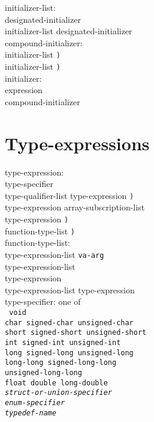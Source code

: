 \documentclass[a4j,twocolumn]{article}
\begin{document}
\noindent
initializer-list: \\
\quad designated-initializer \\
\quad initializer-list designated-initializer \\

\noindent
compound-initializer: \\
 initializer-list {\tt )}\\
 initializer-list {\tt )}\\

\noindent
initializer: \\
\quad expression \\
\quad compound-initializer \\
                            
\rm
\section{Type-expressions}
\it

\noindent
type-expression: \\
\quad type-specifier \\
\quad {\tt (}type-qualifier-list type-expression {\tt )} \\
 type-expression array-subscription-list\opt {\tt )} \\
  type-expression {\tt )} \\
 function-type-list {\tt )} \\

\noindent
function-type-list: \\
\quad type-expression-list {\tt va-arg}\opt \\

\noindent
type-expression-list \\
\quad type-expression \\
\quad type-expression-list type-expression \\

\noindent
type-specifier: {\rm one of} \\ \tt
\quad void \\
\quad char signed-char unsigned-char \\
\quad short signed-short unsigned-short \\
\quad int signed-int unsigned-int \\
\quad long signed-long unsigned-long \\
\quad long-long signed-long-long \\
\quad unsigned-long-long \\
\quad float double long-double \\ \it
\quad struct-or-union-specifier \\
\quad enum-specifier \\
\quad typedef-name \\
\end{document}
